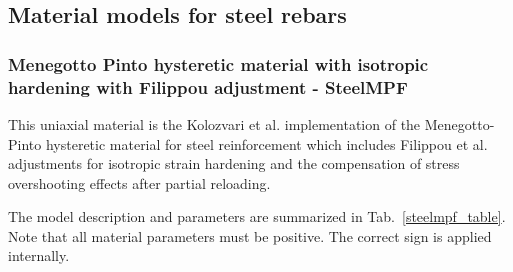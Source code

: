 \documentclass[a4paper]{article}
\begin{document}
\clearpage

\subsection{Material models for steel rebars}

\subsubsection{Menegotto Pinto hysteretic material with isotropic hardening with Filippou adjustment - SteelMPF}

This uniaxial material is the Kolozvari et al. \cite{Kolozvari} implementation of the
Menegotto-Pinto hysteretic material for steel reinforcement \cite{MenegottoPinto} which
includes Filippou et al. \cite{Filippou} adjustments for isotropic strain hardening and
the compensation of stress overshooting effects after partial reloading.

The model description and parameters are summarized in Tab.~\ref{steelmpf_table}.
Note that all material parameters must be positive. The correct sign is applied internally.
\end{document}
